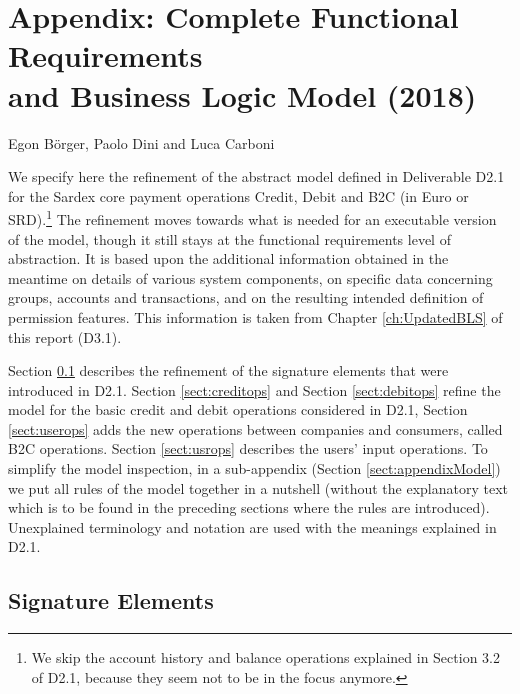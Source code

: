 \chapter*{Appendix: Complete Functional Requirements\\ and Business Logic Model (2018)}
\label{appendix}

\vspace{-1cm}
\begin{center}
Egon B\"orger, Paolo Dini and Luca Carboni
\end{center}

We specify here the refinement of the abstract model defined in Deliverable D2.1 \cite{INTERLACE_D21} for the Sardex core payment operations Credit, Debit and B2C (in Euro or SRD).\footnote{We skip the account history and balance operations explained in Section 3.2 of D2.1, because they seem not to be in the focus anymore.} The refinement moves towards what is needed for an executable version of the model, though it still stays at the functional requirements level of abstraction. It is based upon the additional information obtained in the meantime on details of various system components, on specific data concerning groups, accounts and transactions, and on the resulting intended definition of permission features. This information is taken from Chapter \ref{ch:UpdatedBLS} of this report (D3.1).

Section \ref{sect:signature} describes the refinement of the signature elements that were introduced in D2.1. Section \ref{sect:creditops} and Section \ref{sect:debitops} refine the model for the basic credit and debit operations considered in D2.1,  Section \ref{sect:userops} adds the new operations between companies and consumers, called B2C operations. Section \ref{sect:usrops} describes the users' input operations. To simplify the model inspection, in a sub-appendix (Section \ref{sect:appendixModel}) we put all rules of the model together in a nutshell (without the explanatory text which is to be found in the preceding sections where the rules are introduced).  Unexplained terminology and notation are used with the meanings explained in D2.1.

\section{Signature Elements}
\label{sect:signature}


